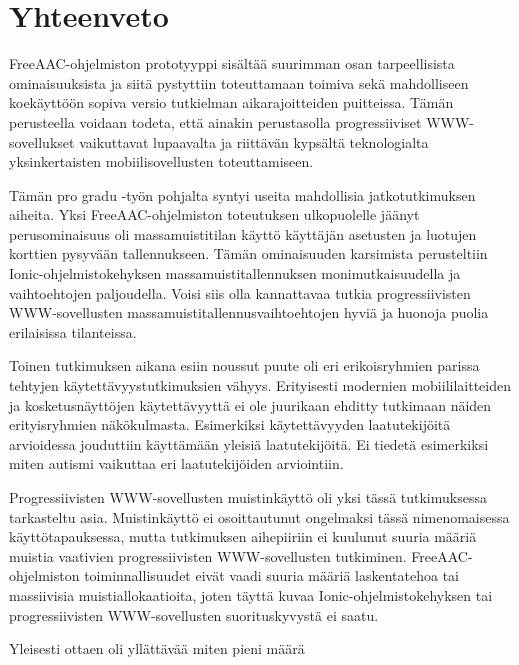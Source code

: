 \documentclass[utf8]{gradu3}
\begin{document}
\chapter{Yhteenveto}

FreeAAC-ohjelmiston prototyyppi sisältää suurimman osan tarpeellisista ominaisuuksista ja siitä pystyttiin toteuttamaan toimiva sekä mahdolliseen koekäyttöön sopiva versio tutkielman aikarajoitteiden puitteissa. Tämän perusteella voidaan todeta, että ainakin perustasolla progressiiviset WWW-sovellukset vaikuttavat lupaavalta ja riittävän kypsältä teknologialta yksinkertaisten mobiilisovellusten toteuttamiseen.

Tämän pro gradu -työn pohjalta syntyi useita mahdollisia jatkotutkimuksen aiheita. Yksi FreeAAC-ohjelmiston toteutuksen ulkopuolelle jäänyt perusominaisuus oli massamuistitilan käyttö käyttäjän asetusten ja luotujen korttien pysyvään tallennukseen. Tämän ominaisuuden karsimista perusteltiin Ionic-ohjelmistokehyksen massamuistitallennuksen monimutkaisuudella ja vaihtoehtojen paljoudella. Voisi siis olla kannattavaa tutkia progressiivisten WWW-sovellusten massamuistitallennusvaihtoehtojen hyviä ja huonoja puolia erilaisissa tilanteissa.

Toinen tutkimuksen aikana esiin noussut puute oli eri erikoisryhmien parissa tehtyjen käytettävyystutkimuksien vähyys. Erityisesti modernien mobiililaitteiden ja kosketusnäyttöjen käytettävyyttä ei ole juurikaan ehditty tutkimaan näiden erityisryhmien näkökulmasta. Esimerkiksi käytettävyyden laatutekijöitä arvioidessa jouduttiin käyttämään yleisiä laatutekijöitä. Ei tiedetä esimerkiksi miten autismi vaikuttaa eri laatutekijöiden arviointiin.

Progressiivisten WWW-sovellusten muistinkäyttö oli yksi tässä tutkimuksessa tarkasteltu asia. Muistinkäyttö ei osoittautunut ongelmaksi tässä nimenomaisessa käyttötapauksessa, mutta tutkimuksen aihepiiriin ei kuulunut suuria määriä muistia vaativien progressiivisten WWW-sovellusten tutkiminen. FreeAAC-ohjelmiston toiminnallisuudet eivät vaadi suuria määriä laskentatehoa tai massiivisia muistiallokaatioita, joten täyttä kuvaa Ionic-ohjelmistokehyksen tai progressiivisten WWW-sovellusten suorituskyvystä ei saatu.

Yleisesti ottaen oli yllättävää miten pieni määrä 


\printbibliography

%
\end{document}
